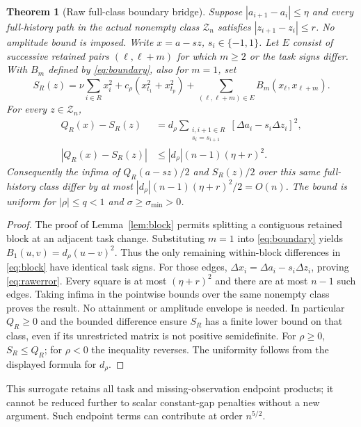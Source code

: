 \documentclass[11pt]{article}
\newtheorem{theorem}{Theorem}
\newcommand{\sig}{\sigma}
\begin{document}
\begin{theorem}[Raw full-class boundary bridge]\label{thm:raw}
Suppose $|a_{i+1}-a_i|\le\eta$ and every full-history path in the actual
nonempty class $\mathcal Z_n$ satisfies $|z_{i+1}-z_i|\le r$.
No amplitude bound is imposed. Write $x=a-sz$, $s_i\in\{-1,1\}$.
Let $E$ consist of successive retained pairs $(\ell,\ell+m)$ for which
$m\ge2$ or the task signs differ. With $B_m$ defined by
\eqref{eq:boundary}, also for $m=1$, set
\begin{equation}\label{eq:rawsurrogate}
 S_R(z)=\nu\sum_{i\in R}x_i^2+c_\rho(x_{t_1}^2+x_{t_p}^2)
 +\sum_{(\ell,\ell+m)\in E}B_m(x_\ell,x_{\ell+m}).
\end{equation}
For every $z\in\mathcal Z_n$,
\begin{align}\label{eq:rawerror}
 Q_R(x)-S_R(z)
 &=d_\rho\sum_{\substack{i,i+1\in R\\s_i=s_{i+1}}}
 [\Delta a_i-s_i\Delta z_i]^2,\\
 |Q_R(x)-S_R(z)|&\le |d_\rho|(n-1)(\eta+r)^2.\nonumber
\end{align}
Consequently the infima of $Q_R(a-sz)/2$ and $S_R(z)/2$ over this same
full-history class differ by at most $|d_\rho|(n-1)(\eta+r)^2/2=O(n)$.
The bound is uniform for $|\rho|\le q<1$ and $\sig\ge\sig_{\min}>0$.
\end{theorem}
\begin{proof}
The proof of Lemma~\ref{lem:block} permits splitting a contiguous retained
block at an adjacent task change. Substituting $m=1$ into
\eqref{eq:boundary} yields $B_1(u,v)=d_\rho(u-v)^2$.
Thus the only remaining within-block differences in \eqref{eq:block} have
identical task signs. For those edges,
$\Delta x_i=\Delta a_i-s_i\Delta z_i$, proving \eqref{eq:rawerror}.
Every square is at most $(\eta+r)^2$ and there are at most $n-1$ such edges.
Taking infima in the pointwise bounds over the same nonempty class proves
the result. No attainment or amplitude envelope is needed. In particular
$Q_R\ge0$ and the bounded difference ensure $S_R$ has a finite lower bound
on that class, even if its unrestricted matrix is not positive semidefinite.
For $\rho\ge0$, $S_R\le Q_R$; for $\rho<0$ the inequality reverses.
The uniformity follows from the displayed formula for $d_\rho$.
\end{proof}
This surrogate retains all task and missing-observation endpoint products;
it cannot be reduced further to scalar constant-gap penalties without a
new argument. Such endpoint terms can contribute at order $n^{5/2}$.
\end{document}
